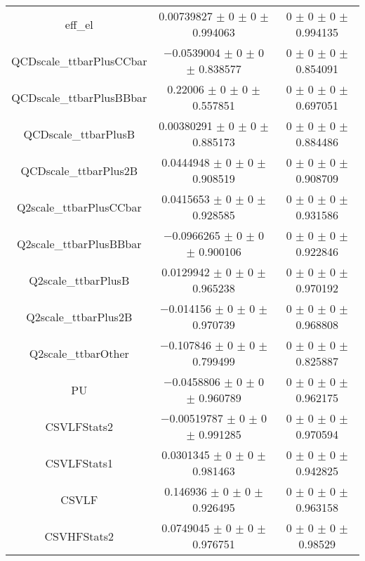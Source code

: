 \begin{table}
\begin{tabular}{ccc}
eff\_el & \num{0.00739827} $\pm$ \num{0} $\pm$ \num{0} $\pm$ \num{0.994063} & \num{0} $\pm$ \num{0} $\pm$ \num{0} $\pm$ \num{0.994135}\\
QCDscale\_ttbarPlusCCbar & \num{-0.0539004} $\pm$ \num{0} $\pm$ \num{0} $\pm$ \num{0.838577} & \num{0} $\pm$ \num{0} $\pm$ \num{0} $\pm$ \num{0.854091}\\
QCDscale\_ttbarPlusBBbar & \num{0.22006} $\pm$ \num{0} $\pm$ \num{0} $\pm$ \num{0.557851} & \num{0} $\pm$ \num{0} $\pm$ \num{0} $\pm$ \num{0.697051}\\
QCDscale\_ttbarPlusB & \num{0.00380291} $\pm$ \num{0} $\pm$ \num{0} $\pm$ \num{0.885173} & \num{0} $\pm$ \num{0} $\pm$ \num{0} $\pm$ \num{0.884486}\\
QCDscale\_ttbarPlus2B & \num{0.0444948} $\pm$ \num{0} $\pm$ \num{0} $\pm$ \num{0.908519} & \num{0} $\pm$ \num{0} $\pm$ \num{0} $\pm$ \num{0.908709}\\
Q2scale\_ttbarPlusCCbar & \num{0.0415653} $\pm$ \num{0} $\pm$ \num{0} $\pm$ \num{0.928585} & \num{0} $\pm$ \num{0} $\pm$ \num{0} $\pm$ \num{0.931586}\\
Q2scale\_ttbarPlusBBbar & \num{-0.0966265} $\pm$ \num{0} $\pm$ \num{0} $\pm$ \num{0.900106} & \num{0} $\pm$ \num{0} $\pm$ \num{0} $\pm$ \num{0.922846}\\
Q2scale\_ttbarPlusB & \num{0.0129942} $\pm$ \num{0} $\pm$ \num{0} $\pm$ \num{0.965238} & \num{0} $\pm$ \num{0} $\pm$ \num{0} $\pm$ \num{0.970192}\\
Q2scale\_ttbarPlus2B & \num{-0.014156} $\pm$ \num{0} $\pm$ \num{0} $\pm$ \num{0.970739} & \num{0} $\pm$ \num{0} $\pm$ \num{0} $\pm$ \num{0.968808}\\
Q2scale\_ttbarOther & \num{-0.107846} $\pm$ \num{0} $\pm$ \num{0} $\pm$ \num{0.799499} & \num{0} $\pm$ \num{0} $\pm$ \num{0} $\pm$ \num{0.825887}\\
PU & \num{-0.0458806} $\pm$ \num{0} $\pm$ \num{0} $\pm$ \num{0.960789} & \num{0} $\pm$ \num{0} $\pm$ \num{0} $\pm$ \num{0.962175}\\
CSVLFStats2 & \num{-0.00519787} $\pm$ \num{0} $\pm$ \num{0} $\pm$ \num{0.991285} & \num{0} $\pm$ \num{0} $\pm$ \num{0} $\pm$ \num{0.970594}\\
CSVLFStats1 & \num{0.0301345} $\pm$ \num{0} $\pm$ \num{0} $\pm$ \num{0.981463} & \num{0} $\pm$ \num{0} $\pm$ \num{0} $\pm$ \num{0.942825}\\
CSVLF & \num{0.146936} $\pm$ \num{0} $\pm$ \num{0} $\pm$ \num{0.926495} & \num{0} $\pm$ \num{0} $\pm$ \num{0} $\pm$ \num{0.963158}\\
CSVHFStats2 & \num{0.0749045} $\pm$ \num{0} $\pm$ \num{0} $\pm$ \num{0.976751} & \num{0} $\pm$ \num{0} $\pm$ \num{0} $\pm$ \num{0.98529}\\

\end{tabular}
\end{table}

